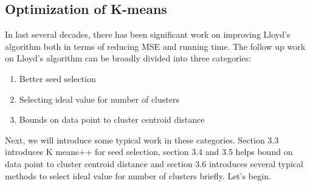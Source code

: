 \documentclass[11pt]{article}
\begin{document}
\subsection{Optimization of K-means}
In last several decades, there has been significant work on improving Lloyd’s algorithm both in terms of reducing MSE and running time. The follow up
work on Lloyd’s algorithm can be broadly divided into three categories:
\begin{enumerate}
\item Better seed selection
\item Selecting ideal value for number of clusters
\item Bounds on data point to cluster centroid distance
\end{enumerate}
Next, we will introduce some typical work in these categories. Section 3.3 introduces K means++ for seed selection, section 3.4 and 3.5 helps bound on data point to cluster centroid distance and section 3.6 introduces several typical methods to select ideal value for number of clusters briefly. Let's begin.


\end{document}
